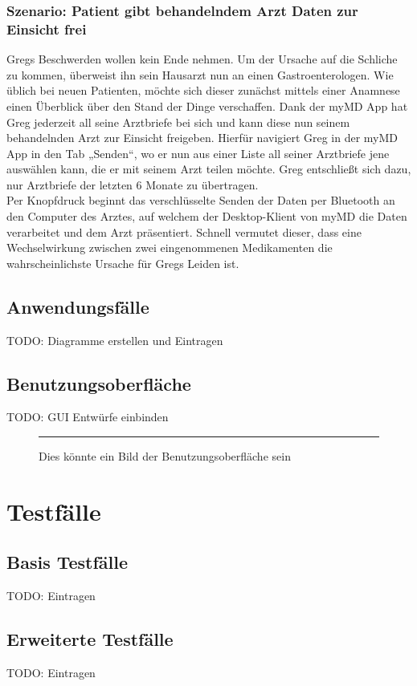 \documentclass[a4paper]{scrreprt}
\begin{document}
\subsection{Szenario: Patient gibt behandelndem Arzt Daten zur Einsicht frei}
Gregs Beschwerden wollen kein Ende nehmen. Um der Ursache auf die Schliche zu kommen, überweist ihn sein Hausarzt nun an einen Gastroenterologen. Wie üblich bei neuen Patienten, möchte sich dieser zunächst mittels einer Anamnese einen Überblick über den Stand der Dinge verschaffen. Dank der myMD \gls{App} hat Greg jederzeit all seine Arztbriefe bei sich und kann diese nun seinem behandelnden Arzt zur Einsicht freigeben. Hierfür navigiert Greg in der myMD App in den Tab „Senden“, wo er nun aus einer Liste all seiner Arztbriefe jene auswählen kann, die er mit seinem Arzt teilen möchte. Greg entschließt sich dazu, nur Arztbriefe der letzten 6 Monate zu übertragen. \\
Per Knopfdruck beginnt das verschlüsselte Senden der Daten per \gls{Bluetooth} an den Computer des Arztes, auf welchem der Desktop-Klient von myMD die Daten verarbeitet und dem Arzt präsentiert. Schnell vermutet dieser, dass eine Wechselwirkung zwischen zwei eingenommenen Medikamenten die wahrscheinlichste Ursache für Gregs Leiden ist.

\section{Anwendungsfälle}
TODO: Diagramme erstellen und Eintragen
\section{Benutzungsoberfläche}
TODO: GUI Entwürfe  einbinden
\begin{figure}[ht]
  \centering
  \rule{8cm}{6cm}
  \caption{Dies könnte ein Bild der Benutzungsoberfläche sein}
\end{figure}

\chapter{Testfälle}
\section{Basis Testfälle}
TODO: Eintragen
\section{Erweiterte Testfälle}
TODO: Eintragen
\end{document}

